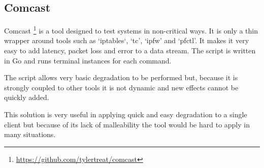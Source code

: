 \subsection{Comcast}
Comcast \footnote{\url{https://github.com/tylertreat/comcast}} is a tool designed to test systems in non-critical ways. It is only a thin wrapper around tools such as `iptables`, `tc', `ipfw' and `pfctl'. It makes it very easy to add latency, packet loss and error to a data stream. The script is written in Go and runs terminal instances for each command.

The script allows very basic degradation to be performed but, because it is strongly coupled to other tools it is not dynamic and new effects cannot be quickly added.

This solution is very useful in applying quick and easy degradation to a single client but because of its lack of malleability the tool would be hard to apply in many situations.